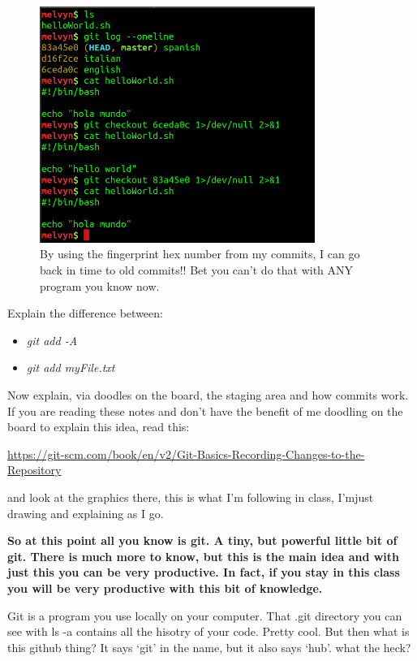 \documentclass[10pt]{article}
\begin{document}
\begin{figure}[h]
\centering
	\includegraphics[width=0.8\textwidth]{Images/checkoutOldCommits.png}
	\caption{By using the fingerprint hex number from my commits, I can go back
in time to old commits!! Bet you can't do that with ANY program you know now. }
	\label{fig:checkoutold}
\end{figure}

Explain the difference between:
\begin{itemize}
\item \textit{git add -A}
\item \textit{git add myFile.txt}
\end{itemize}

Now explain, via doodles on the board, the staging area and how commits work. If
you are reading these notes and don't have the benefit of me doodling on the
board to explain this idea, read this:

\url{https://git-scm.com/book/en/v2/Git-Basics-Recording-Changes-to-the-Repository}

and look at the graphics there, this is what I'm following in class, I'mjust
drawing and explaining as I go.


\textbf{So at this point all you know is git. A tiny, but powerful little bit of
git. There is much more to know, but this is the main idea and with just this
you can be very productive. In fact, if you stay in this class you will be very
productive with this bit of knowledge.}

Git is a program you use locally on your computer. That .git directory you can
see with ls -a contains all the hisotry of your code. Pretty cool. But then what
is this github thing? It says `git' in the name, but it also says `hub'. what
the heck?
\end{document}
